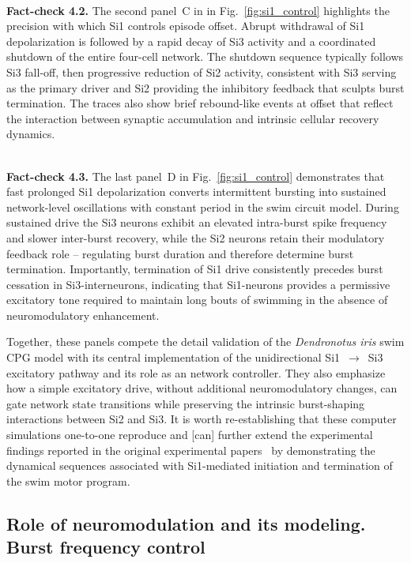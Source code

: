 \documentclass[nofootinbib,aip,amsmath,amssymb,reprint,twocolumn,10pt]{revtex4-2}
\begin{document}
 ~\\
{\bf Fact-check 4.2.} The second panel~C in in Fig.~\ref{fig:si1_control} highlights the precision with which Si1 controls episode offset. Abrupt withdrawal of Si1 depolarization is followed by a rapid decay of Si3 activity and a coordinated shutdown of the entire four-cell network. The shutdown sequence typically follows Si3 fall-off, then progressive reduction of Si2 activity, consistent with Si3 serving as the primary driver and Si2 providing the inhibitory feedback that sculpts burst termination. The traces also show brief rebound-like events at offset that reflect the interaction between synaptic accumulation and intrinsic cellular recovery dynamics.

 ~\\
{\bf Fact-check 4.3.} The last panel~D in Fig.~\ref{fig:si1_control} demonstrates that fast prolonged Si1 depolarization converts intermittent bursting into sustained network-level oscillations with constant period in the swim circuit model. During sustained drive the Si3 neurons exhibit an elevated intra-burst spike frequency and slower inter-burst recovery, while the Si2 neurons retain their modulatory feedback role -- regulating burst duration and therefore determine burst termination. Importantly, termination of Si1 drive consistently precedes burst cessation in Si3-interneurons, indicating that Si1-neurons  provides a permissive excitatory tone required to maintain long bouts of swimming in the absence of neuromodulatory enhancement.

Together, these panels compete the detail validation of the {\em \textit{Dendronotus iris}} swim CPG model with its central implementation of the unidirectional Si1~$\to$~Si3 excitatory pathway and its role as an network controller. They also emphasize how a simple excitatory drive, without additional neuromodulatory changes, can gate network state transitions while preserving the intrinsic burst-shaping interactions between Si2 and Si3. It is worth re-establishing that these computer simulations one-to-one reproduce and [can] further extend the experimental findings reported in the original experimental papers~\cite{sakurai2019command, SakuraiKatz2016} by demonstrating the dynamical sequences associated with Si1-mediated initiation and termination of the swim motor program.




\subsection{Role of neuromodulation and its modeling. Burst frequency control}
\end{document}
